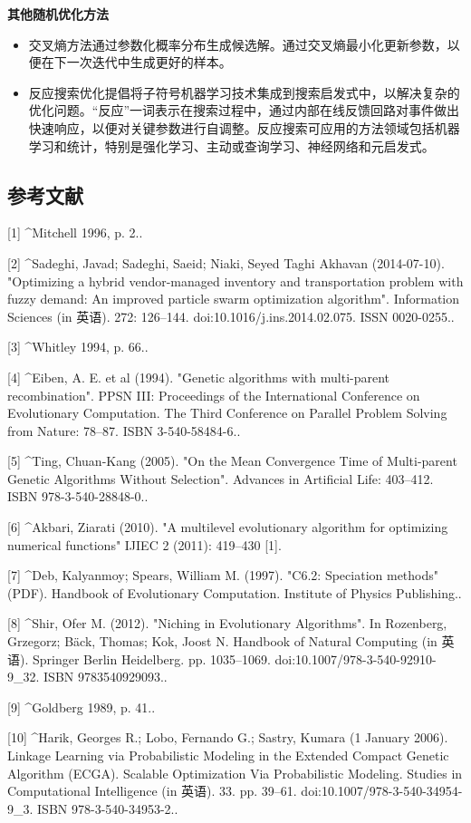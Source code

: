 \textbf{其他随机优化方法}
\begin{itemize}
\item 交叉熵方法通过参数化概率分布生成候选解。通过交叉熵最小化更新参数，以便在下一次迭代中生成更好的样本。
\item 反应搜索优化提倡将子符号机器学习技术集成到搜索启发式中，以解决复杂的优化问题。“反应”一词表示在搜索过程中，通过内部在线反馈回路对事件做出快速响应，以便对关键参数进行自调整。反应搜索可应用的方法领域包括机器学习和统计，特别是强化学习、主动或查询学习、神经网络和元启发式。
\end{itemize}

\subsection{参考文献}
[1]
^Mitchell 1996, p. 2..

[2]
^Sadeghi, Javad; Sadeghi, Saeid; Niaki, Seyed Taghi Akhavan (2014-07-10). "Optimizing a hybrid vendor-managed inventory and transportation problem with fuzzy demand: An improved particle swarm optimization algorithm". Information Sciences (in 英语). 272: 126–144. doi:10.1016/j.ins.2014.02.075. ISSN 0020-0255..

[3]
^Whitley 1994, p. 66..

[4]
^Eiben, A. E. et al (1994). "Genetic algorithms with multi-parent recombination". PPSN III: Proceedings of the International Conference on Evolutionary Computation. The Third Conference on Parallel Problem Solving from Nature: 78–87. ISBN 3-540-58484-6..

[5]
^Ting, Chuan-Kang (2005). "On the Mean Convergence Time of Multi-parent Genetic Algorithms Without Selection". Advances in Artificial Life: 403–412. ISBN 978-3-540-28848-0..

[6]
^Akbari, Ziarati (2010). "A multilevel evolutionary algorithm for optimizing numerical functions" IJIEC 2 (2011): 419–430 [1].

[7]
^Deb, Kalyanmoy; Spears, William M. (1997). "C6.2: Speciation methods" (PDF). Handbook of Evolutionary Computation. Institute of Physics Publishing..

[8]
^Shir, Ofer M. (2012). "Niching in Evolutionary Algorithms". In Rozenberg, Grzegorz; Bäck, Thomas; Kok, Joost N. Handbook of Natural Computing (in 英语). Springer Berlin Heidelberg. pp. 1035–1069. doi:10.1007/978-3-540-92910-9_32. ISBN 9783540929093..

[9]
^Goldberg 1989, p. 41..

[10]
^Harik, Georges R.; Lobo, Fernando G.; Sastry, Kumara (1 January 2006). Linkage Learning via Probabilistic Modeling in the Extended Compact Genetic Algorithm (ECGA). Scalable Optimization Via Probabilistic Modeling. Studies in Computational Intelligence (in 英语). 33. pp. 39–61. doi:10.1007/978-3-540-34954-9_3. ISBN 978-3-540-34953-2..

